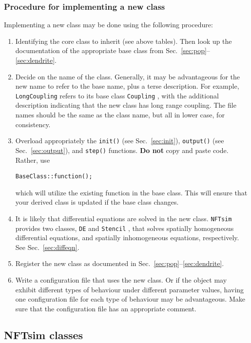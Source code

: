 \documentclass[12pt,a4paper]{article}
\newcommand{\type}[1]{{\small\small\tt #1} }
\newcommand{\NF}[0]{\type{NFTsim}}
\begin{document}
\subsubsection{Procedure for implementing a new class}

Implementing a new class may be done using the following procedure:
\begin{enumerate}
    \item Identifying the core class to inherit (see above tables). Then look up the documentation of the appropriate base class from Sec.~\ref{sec:pop}--\ref{sec:dendrite}.
    \item Decide on the name of the class. Generally, it may be advantageous for the new name to refer to the base name, plus a terse description. For example, \type{LongCoupling} refers to its base class \type{Coupling}, with the additional description indicating that the new class has long range coupling. The file names should be the same as the class name, but all in lower case, for consistency.
    \item Overload appropriately the \type{init()} (see Sec.~\ref{sec:init}), \type{output()} (see Sec.~\ref{sec:output}), and \type{step()} functions. {\bf Do not} copy and paste code. Rather, use
        \begin{lstlisting}
BaseClass::function();
        \end{lstlisting}
    which will utilize the existing function in the base class. This will ensure that your derived class is updated if the base class changes.
    \item It is likely that differential equations are solved in the new class. \NF provides two classes, \type{DE} and \type{Stencil}, that solves spatially homogeneous differential equations, and spatially inhomogeneous equations, respectively. See Sec.~\ref{sec:diffeqn}.
    \item Register the new class as documented in Sec.~\ref{sec:pop}--\ref{sec:dendrite}.
    \item Write a configuration file that uses the new class. Or if the object may exhibit different types of behaviour under different parameter values, having one configuration file for each type of behaviour may be advantageous. Make sure that the configuration file has an appropriate comment.
\end{enumerate}

\subsection{NFTsim classes}
\end{document}
